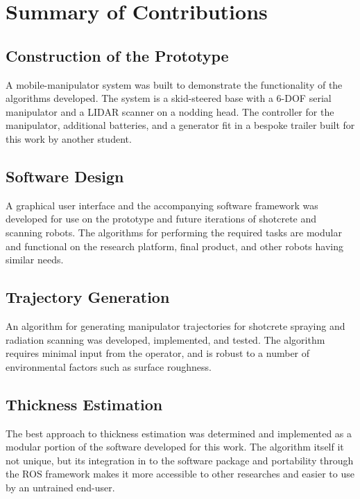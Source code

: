 \section{Summary of Contributions}
\label{sec:contributions}

\subsection{Construction of the Prototype}
A mobile-manipulator system was built to demonstrate the functionality of the algorithms developed. The system is a skid-steered base with a 6-DOF serial manipulator and a LIDAR scanner on a nodding head. The controller for the manipulator, additional batteries, and a generator fit in a bespoke trailer built for this work by another student.\\

\subsection{Software Design}
A graphical user interface and the accompanying software framework was developed for use on the prototype and future iterations of shotcrete and scanning robots. The algorithms for performing the required tasks are modular and functional on the research platform, final product, and other robots having similar needs.\\

\subsection{Trajectory Generation}
An algorithm for generating manipulator trajectories for shotcrete spraying and radiation scanning was developed, implemented, and tested. The algorithm requires minimal input from the operator, and is robust to a number of environmental factors such as surface roughness.\\

\subsection{Thickness Estimation}
The best approach to thickness estimation was determined and implemented as a modular portion of the software developed for this work. The algorithm itself it not unique, but its integration in to the software package and portability through the ROS framework makes it more accessible to other researches and easier to use by an untrained end-user.\\

